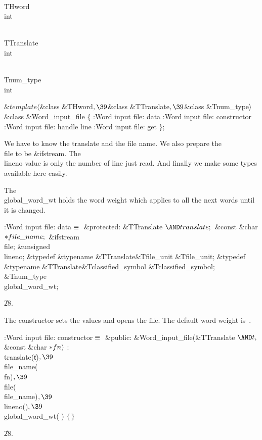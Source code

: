 \Y\B\F\\{THword} \5
\\{int}\par
\B\F\\{TTranslate} \5
\\{int}\par
\B\F\\{Tnum\_type} \5
\\{int}\par
\Y\B$\&{template}\langle{}$\&{class} \&{THword}${},\39{}$\&{class} %
\&{TTranslate}${},\39{}$\&{class} \&{Tnum\_type}${}\rangle{}$\6
\&{class} \&{Word\_input\_file} ${}\{{}$\1\6
:Word input file: data\X\6
:Word input file: constructor\X\6
:Word input file: handle line\X\6
:Word input file: get\X\2\6
${}\}{}$;\par
\fi

We have to know the translate and the file name. We also prepare the
\\{file} to be \&{ifstream}. The \\{lineno} value is only the number of line
just read. And finally we make some types available here easily.

The \\{global\_word\_wt} holds the word weight which applies to all the next
words until it is changed.

\Y\B\4:Word input file: data\X${}\equiv{}$\6
\4\&{protected}:\6
\&{TTranslate} ${}{\AND}\\{translate};{}$\6
\&{const} \&{char} ${}{*}\\{file\_name};{}$\6
\&{ifstream} \\{file};\6
\&{unsigned} \\{lineno};\6
\&{typedef} \&{typename} \&{TTranslate}\DC\&{Tfile\_unit} \&{Tfile\_unit};\6
\&{typedef} \&{typename} \&{TTranslate}\DC\&{Tclassified\_symbol} %
\&{Tclassified\_symbol};\6
\&{Tnum\_type} \\{global\_word\_wt};\par
\U28.\fi

The constructor sets the values and opens the file. The default word
weight is~.

\Y\B\4:Word input file: constructor\X${}\equiv{}$\6
\4\&{public}:\6
\&{Word\_input\_file}(\&{TTranslate} ${}{\AND}\|t,\39{}$\&{const} \&{char}
${}{*}\\{fn}){}$\1\1\2\2\6
: \\{translate}(\|t)${},\39{}$ \\{file\_name}(\\{fn})${},\39{}$ \\{file}(%
\\{file\_name})${},\39{}$ \\{lineno}()${},\39{}$ \\{global\_word\_wt}(%
) ${}\{\,\}{}$\par
\U28.\fi


